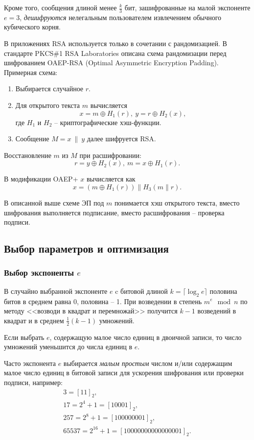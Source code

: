 Кроме того, сообщения длиной менее $\frac{k}{3}$ бит, зашифрованные на малой экспоненте $e=3$, \emph{дешифруются} нелегальным пользователем извлечением обычного кубического корня.

В приложениях RSA используется только в сочетании с рандомизацией. В стандарте PKCS\#1 RSA Laboratories описана схема рандомизации перед шифрованием OAEP-RSA (Optimal Asymmetric Encryption Padding). Примерная схема:
\begin{enumerate}
    \item Выбирается случайное $r$.
    \item Для открытого текста $m$ вычисляется
        \[ x = m \oplus H_1(r), ~ y = r \oplus H_2(x), \]
        где $H_1$ и $H_2$ -- криптографические хэш-функции.
    \item Сообщение $M = x ~\|~ y$ далее шифруется RSA.
\end{enumerate}
Восстановление $m$ из $M$ при расшифровании:
    \[ r = y \oplus H_2(x), ~ m = x \oplus H_1(r). \]

В модификации OAEP+ $x$ вычисляется как
    \[ x = (m \oplus H_1(r)) \| H_3(m \| r). \]

В описанной выше схеме ЭП под $m$ понимается хэш открытого текста, вместо шифрования выполняется подписание, вместо расшифрования -- проверка подписи.


\subsection{Выбор параметров и оптимизация}

\subsubsection{Выбор экспоненты $e$}

В случайно выбранной экспоненте $e$ c битовой длиной $k = \lceil \log_2 e \rceil$ половина битов в среднем равна 0, половина -- 1. При возведении в степень $m^e \mod n$ по методу <<возводи в квадрат и перемножай>> получится $k-1$ возведений в квадрат и в среднем
 $\frac{1}{2}(k-1)$ умножений.

Если выбрать $e$, содержащую малое число единиц в двоичной записи, то число умножений уменьшится до числа единиц в $e$.

Часто экспонента $e$ выбирается \emph{малым} \emph{простым} числом и/или содержащим малое число единиц в битовой записи для ускорения шифрования или проверки подписи, например:
\[
    \begin{array}{l}
        3 = [11]_2, \\
        17 = 2^4+1 = [10001]_2, \\
        257 = 2^8+1 = [100000001]_2, \\
        65537 = 2^{16}+1 = [10000000000000001]_2.
    \end{array}
\]

